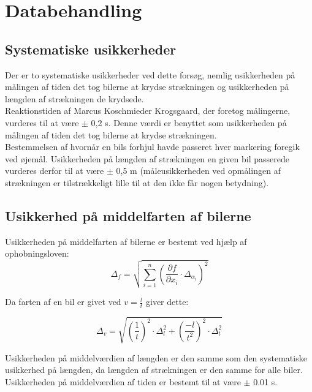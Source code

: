\documentclass[hidelinks]{article}
\begin{document}
\newpage

\section{Databehandling}

\subsection{Systematiske usikkerheder}

Der er to systematiske usikkerheder ved dette forsøg, nemlig usikkerheden på målingen af tiden det tog bilerne at krydse strækningen og usikkerheden på længden af strækningen de krydsede.\\

Reaktionstiden af Marcus Koschmieder Krogsgaard, der foretog målingerne, vurderes til at være $\pm$ 0,2 s. Denne værdi er benyttet som usikkerheden på målingen af tiden det tog bilerne at krydse strækningen.\\

Bestemmelsen af hvornår en bils forhjul havde passeret hver markering foregik ved øjemål. Usikkerheden på længden af strækningen en given bil passerede vurderes derfor til at være $\pm$ 0,5 m (måleusikkerheden ved opmålingen af strækningen er tilstrækkeligt lille til at den ikke får nogen betydning).\\

\subsection{Usikkerhed på middelfarten af bilerne} \label{usikkerhedmiddelfart}

Usikkerheden på middelfarten af bilerne er bestemt ved hjælp af ophobningsloven:\\

\[\Delta_f = \sqrt{\sum_{i = 1}^{n} \left( \frac{\partial f}{\partial x_i} \cdot \Delta_{\alpha_i} \right)^2}\]

Da farten af en bil er givet ved $v = \frac{l}{t}$ giver dette:

\[\Delta_v = \sqrt{\left(\frac{1}{t}\right)^2 \cdot \Delta^2_l + \left(\frac{-l}{t^2}\right)^2 \cdot \Delta^2_t}\]

Usikkerheden på middelværdien af længden er den samme som den systematiske usikkerhed på længden, da længden af strækningen er den samme for alle biler. Usikkerheden på middelværdien af tiden er bestemt til at være $\pm$ 0.01 s.\\
\end{document}

